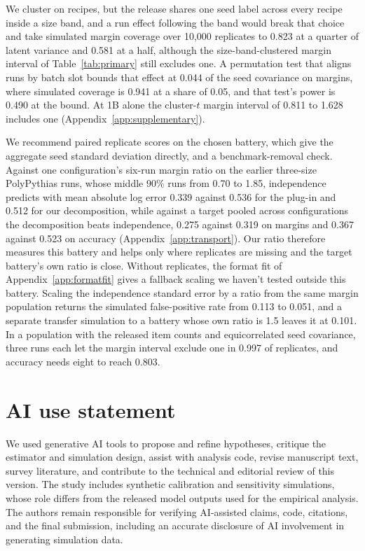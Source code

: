We cluster on recipes, but the release shares one seed label across every recipe inside a size band, and a run effect following the band would break that choice and take simulated margin coverage over 10,000 replicates to 0.823 at a quarter of latent variance and 0.581 at a half, although the size-band-clustered margin interval  of Table~\ref{tab:primary} still excludes one. A permutation test that aligns runs by batch slot bounds that effect at 0.044 of the seed covariance on margins, where simulated coverage is 0.941 at a share of 0.05, and that test's power is 0.490 at the bound. At 1B alone the cluster-$t$ margin interval of 0.811 to 1.628 includes one (Appendix~\ref{app:supplementary}).

We recommend paired replicate scores on the chosen battery, which give the aggregate seed standard deviation directly, and a benchmark-removal check. Against one configuration's six-run margin ratio on the earlier three-size PolyPythias runs, whose middle 90\% runs from 0.70 to 1.85, independence predicts with mean absolute log error 0.339 against 0.536 for the plug-in and 0.512 for our decomposition, while against a target pooled across configurations the decomposition beats independence, 0.275 against 0.319 on margins and 0.367 against 0.523 on accuracy (Appendix~\ref{app:transport}). Our ratio therefore measures this battery and helps only where replicates are missing and the target battery's own ratio is close. Without replicates, the format fit of Appendix~\ref{app:formatfit} gives a fallback scaling we haven't tested outside this battery. Scaling the independence standard error by a ratio from the same margin population returns the simulated false-positive rate from 0.113 to 0.051, and a separate transfer simulation to a battery whose own ratio is 1.5 leaves it at 0.101. In a population with the released item counts and equicorrelated seed covariance, three runs each let the margin interval exclude one in 0.997 of replicates, and accuracy needs eight to reach 0.803.

\label{maintext:end}
\section*{AI use statement}
We used generative AI tools to propose and refine hypotheses, critique the estimator and simulation design, assist with analysis code, revise manuscript text, survey literature, and contribute to the technical and editorial review of this version. The study includes synthetic calibration and sensitivity simulations, whose role differs from the released model outputs used for the empirical analysis. The authors remain responsible for verifying AI-assisted claims, code, citations, and the final submission, including an accurate disclosure of AI involvement in generating simulation data.

